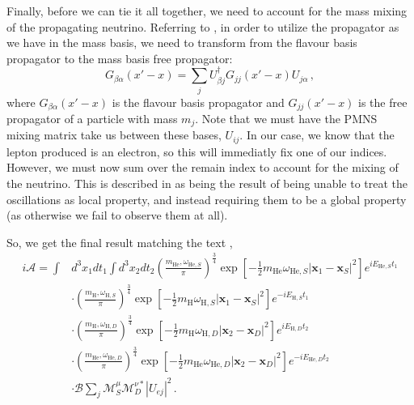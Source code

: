 \documentclass[10pt]{article}
\begin{document}
Finally, before we can tie it all together, we need to account for the mass mixing of the propagating neutrino. Referring to \cite{Beuthe_2003}, in order to utilize the propagator as we have in the mass basis, we need to transform from the flavour basis propagator to the mass basis free propagator:
\begin{equation}
  G_{\beta\alpha}(x' - x) = \sum_{j}U_{\beta j}^{\dagger}G_{jj}(x' - x)U_{j\alpha}\,,
\end{equation}
where $G_{\beta\alpha}(x' - x)$ is the flavour basis propagator and $G_{jj}(x' - x)$ is the free propagator of a particle with mass $m_{j}$. Note that we must have the PMNS mixing matrix take us between these bases, $U_{ij}$. In our case, we know that the lepton produced is an electron, so this will immediatly fix one of our indices. However, we must now sum over the remain index to account for the mixing of the neutrino. This is described in \cite{Beuthe_2003} as being the result of being unable to treat the oscillations as local property, and instead requiring them to be a global property (as otherwise we fail to observe them at all).

So, we get the final result matching the text \cite{Akhmedov_2008},
\begin{equation}\label{eq:final}
  \begin{split}
  i\mathcal{A} = \int & d^{3}x_{1}dt_{1}\int d^{3}x_{2}dt_{2} \left(\frac{m_{\text{He}},\omega_{\text{He},S}}{\pi}\right)^{\frac{3}{4}}\exp\left[-\frac{1}{2}m_{\text{He}}\omega_{\text{He},S}|\bm{x}_{1} - \bm{x}_{S}|^{2}\right]e^{iE_{\text{He},S}t_{1}}\\
  & \cdot \left(\frac{m_{\text{H}},\omega_{\text{H},S}}{\pi}\right)^{\frac{3}{4}}\exp\left[-\frac{1}{2}m_{\text{H}}\omega_{\text{H},S}|\bm{x}_{1} - \bm{x}_{S}|^{2}\right]e^{-iE_{\text{H},S}t_{1}} \\
  & \cdot \left(\frac{m_{\text{H}},\omega_{\text{H},D}}{\pi}\right)^{\frac{3}{4}}\exp\left[-\frac{1}{2}m_{\text{H}}\omega_{\text{H},D}|\bm{x}_{2} - \bm{x}_{D}|^{2}\right]e^{iE_{\text{H},D}t_{2}}\\
  & \cdot \left(\frac{m_{\text{He}},\omega_{\text{He},D}}{\pi}\right)^{\frac{3}{4}}\exp\left[-\frac{1}{2}m_{\text{He}}\omega_{\text{He},D}|\bm{x}_{2} - \bm{x}_{D}|^{2}\right]e^{-iE_{\text{He},D}t_{2}}\\
  & \cdot \mathcal{B}\sum_{j}\mathcal{M}^{\mu}_{S}\mathcal{M}^{\nu *}_{D}|U_{ej}|^{2} \, .
  \end{split}
\end{equation}
\end{document}
